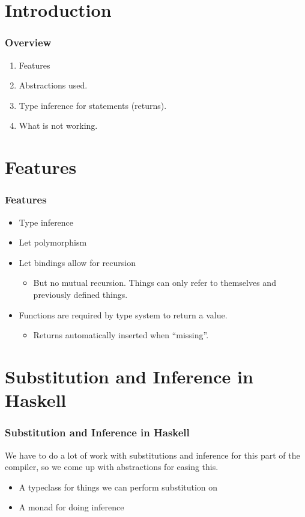 \documentclass{beamer}
\begin{document}
\section{Introduction}

\begin{frame}
\frametitle{Overview}
\begin{enumerate}
\item Features
\item Abstractions used.
\item Type inference for statements (returns).
\item What is not working.
\end{enumerate}
\end{frame}

\section{Features}

\begin{frame}
\frametitle{Features}
\begin{itemize}
\item Type inference
\item Let polymorphism
\item Let bindings allow for recursion
\begin{itemize}
\item But no mutual recursion. Things can only refer to themselves and previously defined things.
\end{itemize}
\item Functions are required by type system to return a value.
\begin{itemize} 
\item Returns automatically inserted when ``missing''.
\end{itemize}
\end{itemize}
\end{frame}

\section{Substitution and Inference in Haskell}

\begin{frame}
\frametitle{Substitution and Inference in Haskell}
We have to do a lot of work with substitutions and inference for this part of the compiler, so we come up with abstractions for easing this.
\begin{itemize}
\item A typeclass for things we can perform substitution on
\item A monad for doing inference
\end{itemize}
\end{frame}
\end{document}
